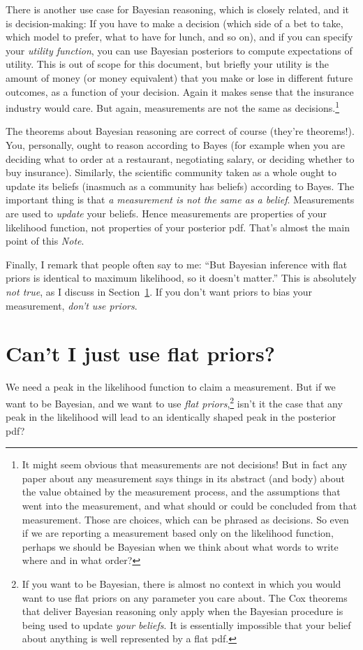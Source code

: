 \documentclass{article}
\newcommand{\documentname}{\textsl{Note}}
\newcommand{\sectionname}{Section}
\newcommand{\secref}[1]{\sectionname~\ref{#1}}
\begin{document}
There is another use case for Bayesian reasoning, which is closely related, and it is decision-making:
If you have to make a decision (which side of a bet to take, which model to prefer, what to have for lunch, and so on),
and if you can specify your \emph{utility function}, you can use Bayesian posteriors to compute expectations of utility.
This is out of scope for this document, but briefly your utility is the amount of money (or money equivalent) that you make or lose in different future outcomes, as a function of your decision.
Again it makes sense that the insurance industry would care.
But again, measurements are not the same as decisions.\footnote{%
It might seem obvious that measurements are not decisions!
But in fact any paper about any measurement says things in its abstract (and body) about the value obtained by the measurement process, and the assumptions that went into the measurement, and what should or could be concluded from that measurement.
Those are choices, which can be phrased as decisions.
So even if we are reporting a measurement based only on the likelihood function, perhaps we should be Bayesian when we think about what words to write where and in what order?}

The theorems about Bayesian reasoning are correct of course (they're theorems!).
You, personally, ought to reason according to Bayes (for example when you are deciding what to order at a restaurant, negotiating salary, or deciding whether to buy insurance).
Similarly, the scientific community taken as a whole ought to update its beliefs (inasmuch as a community has beliefs) according to Bayes.
The important thing is that \emph{a measurement is not the same as a belief}.
Measurements are used to \emph{update} your beliefs.
Hence measurements are properties of your likelihood function, not properties of your posterior pdf.
That's almost the main point of this \documentname.

Finally, I remark that people often say to me: ``But Bayesian inference with flat priors is identical to maximum likelihood, so it doesn't matter.''
This is absolutely \emph{not true}, as I discuss in \secref{sec:flat}.
If you don't want priors to bias your measurement, \emph{don't use priors}.

\section{Can't I just use flat priors?}\label{sec:flat}
We need a peak in the likelihood function to claim a measurement.
But if we want to be Bayesian, and we want to use \emph{flat priors},\footnote{%
If you want to be Bayesian, there is almost no context in which you would want to use flat priors on any parameter you care about.
The Cox theorems that deliver Bayesian reasoning only apply when the Bayesian procedure is being used to update \emph{your beliefs}.
It is essentially impossible that your belief about anything is well represented by a flat pdf.}
isn't it the case that any peak in the likelihood will lead to an identically shaped peak in the posterior pdf?
\end{document}
